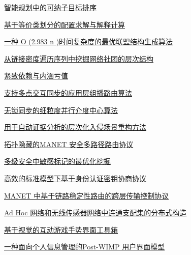 \documentclass[a4paper]{article}
\begin{document}
\href{http://www.jos.org.cn/ch/reader/download_pdf.aspx?file_no=3778&year_id=2011&quarter_id=5&falg=1}{智能规划中的可纳子目标排序}

\href{http://www.jos.org.cn/ch/reader/download_pdf.aspx?file_no=3814&year_id=2011&quarter_id=5&falg=1}{基于等价类划分的配置求解与解释计算}

\href{http://www.jos.org.cn/ch/reader/download_pdf.aspx?file_no=3817&year_id=2011&quarter_id=5&falg=1}{一种 O (2.983 n )时间复杂度的最优联盟结构生成算法}

\href{http://www.jos.org.cn/ch/reader/download_pdf.aspx?file_no=3939&year_id=2011&quarter_id=5&falg=1}{从链接密度遍历序列中挖掘网络社团的层次结构}

\href{http://www.jos.org.cn/ch/reader/download_pdf.aspx?file_no=3807&year_id=2011&quarter_id=5&falg=1}{紧致依赖与内涵亏值}

\href{http://www.jos.org.cn/ch/reader/download_pdf.aspx?file_no=3760&year_id=2011&quarter_id=5&falg=1}{支持多点交互同步的应用层组播路由算法}

\href{http://www.jos.org.cn/ch/reader/download_pdf.aspx?file_no=3811&year_id=2011&quarter_id=5&falg=1}{无锁同步的细粒度并行介度中心算法}

\href{http://www.jos.org.cn/ch/reader/download_pdf.aspx?file_no=3759&year_id=2011&quarter_id=5&falg=1}{用于自动证据分析的层次化入侵场景重构方法}

\href{http://www.jos.org.cn/ch/reader/download_pdf.aspx?file_no=3801&year_id=2011&quarter_id=5&falg=1}{拓扑隐藏的MANET 安全多路径路由协议}

\href{http://www.jos.org.cn/ch/reader/download_pdf.aspx?file_no=3823&year_id=2011&quarter_id=5&falg=1}{多级安全中敏感标记的最优化挖掘}

\href{http://www.jos.org.cn/ch/reader/download_pdf.aspx?file_no=3828&year_id=2011&quarter_id=5&falg=1}{高效的标准模型下基于身份认证密钥协商协议}

\href{http://www.jos.org.cn/ch/reader/download_pdf.aspx?file_no=3840&year_id=2011&quarter_id=5&falg=1}{MANET 中基于链路稳定性路由的跨层传输控制协议}

\href{http://www.jos.org.cn/ch/reader/download_pdf.aspx?file_no=586&year_id=2011&quarter_id=5&falg=1}{Ad Hoc 网络和无线传感器网络中连通支配集的分布式构造}

\href{http://www.jos.org.cn/ch/reader/download_pdf.aspx?file_no=3733&year_id=2011&quarter_id=5&falg=1}{基于视觉的互动游戏手势界面工具箱}

\href{http://www.jos.org.cn/ch/reader/download_pdf.aspx?file_no=3749&year_id=2011&quarter_id=5&falg=1}{一种面向个人信息管理的Post-WIMP 用户界面模型}
\end{document}
